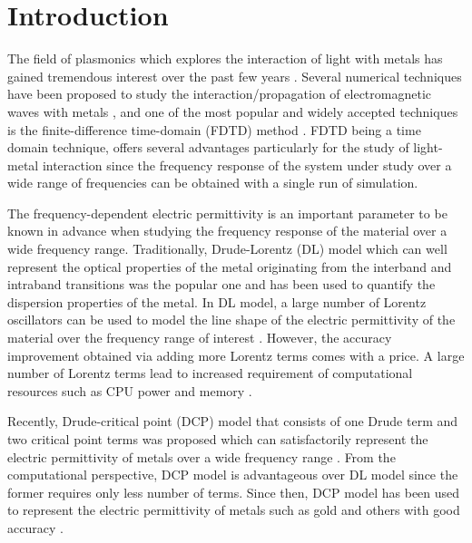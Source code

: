 \section{Introduction}
The field of plasmonics which explores the interaction of light with metals has gained tremendous interest over the past few years \cite{ozbay_plasmonics:_2006}. Several numerical techniques have been proposed to study the interaction/propagation of electromagnetic waves with metals \cite{smajic_comparison_2009}, and one of the most popular and widely accepted techniques is the finite-difference time-domain (FDTD) method \cite{taflove_computational_2005}. FDTD being a time domain technique, offers several advantages particularly for the study of light-metal interaction since the frequency response of the system under study over a wide range of frequencies can be obtained with a single run of simulation.

The frequency-dependent electric permittivity is an important parameter to be known in advance when studying the frequency response of the material over a wide frequency range. Traditionally, Drude-Lorentz (DL) model which can well represent the optical properties of the metal originating from the interband and intraband transitions was the popular one and has been used to quantify the dispersion properties of the metal. In DL model, a large number of Lorentz oscillators can be used to model the line shape of the electric permittivity of the material over the frequency range of interest \cite{etchegoin_analytic_2006}. However, the accuracy improvement obtained via adding more Lorentz terms comes with a price. A large number of Lorentz terms lead to increased requirement of computational resources such as CPU power and memory \cite{young_summary_2001}. 

Recently, Drude-critical point (DCP) model that consists of one Drude term and two critical point terms was proposed which can satisfactorily represent the electric permittivity of metals over a wide frequency range \cite{etchegoin_analytic_2006, etchegoin_erratum:_2007}. From the computational perspective, DCP model is advantageous over DL model since the former requires only less number of terms. Since then, DCP model has been used to represent the electric permittivity of metals such as gold and others with good accuracy \cite{vial_comparison_2008}. 

